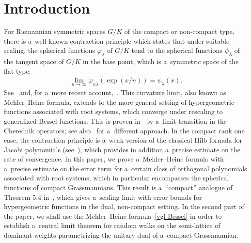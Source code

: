 \documentclass[pdftex]{sigma}
\numberwithin{equation}{section}
\begin{document}

\section{Introduction}

For Riemannian symmetric spaces $G/K$ of the compact or non-compact type, there is a~well-known contraction principle
which states that under suitable scaling, the spherical functions $\varphi_\lambda$ of $G/K$ tend to the spherical
functions $\psi_\lambda$ of the tangent space of $G/K$ in the base point, which is a~symmetric space of the f\/lat type:
\begin{gather*}
\lim_{n\to\infty} \varphi_{n\lambda}(\exp(x/n))=\psi_\lambda(x).
\end{gather*}
See~\cite{C} and, for a~more recent account,~\cite{BO}.
This curvature limit, also known as Mehler--Heine formula, extends to the more general setting of hypergeometric
functions associated with root systems, which converge under rescaling to generalized Bessel functions.
This is proven in~\cite{dJ} by a~limit transition in the Cherednik operators; see also~\cite{BO} for a~dif\/ferent
approach.
In the compact rank one case, the contraction principle is a~weak version of the classical Hilb formula for Jacobi
polynomials (see~\cite[Theorem 8.21.12]{Sz}), which provides in addition a~precise estimate on the rate of
convergence.
In this paper, we prove a~Mehler--Heine formula with a~precise estimate on the error term
for a~certain class of orthogonal polynomials associated with root systems, which in particular encompasses the
spherical functions of compact Grassmannians.
This result is a~``compact'' analogue of Theorem 5.4 in~\cite{RV2}, which gives a~scaling limit with error bounds for
hypergeometric functions in the dual, non-compact setting.
In the second part of the paper, we shall use the Mehler--Heine formula~\ref{vgl-Bessel} in order to establish a~central
limit theorem for random walks on the semi-lattice of dominant weights parametrizing the unitary dual of a~compact
Grassmannian.
\end{document}
